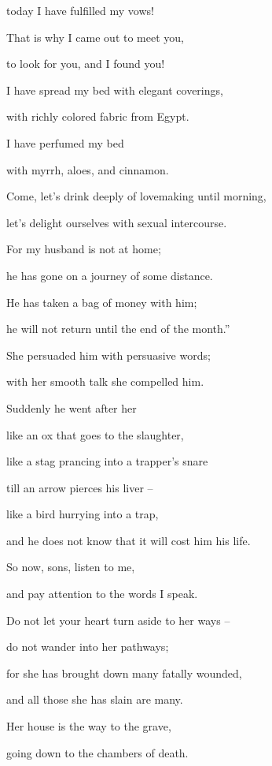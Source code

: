 {\par }{\Q today
I have fulfilled
my vows!
\par }{\Q {}That is why
I came out
to meet
you,
\par }{\Q to look
for you, and I found you!
\par }{\Q {}I have spread
my bed
with elegant coverings,
\par }{\Q with richly
colored
fabric
from Egypt.
\par }{\Q {}I have perfumed
my bed
\par }{\Q with myrrh,
aloes,
and cinnamon.
\par }{\Q {}Come,
let’s drink deeply
of lovemaking
until
morning,
\par }{\Q let’s delight ourselves
with sexual intercourse.
\par }{\Q {}For
my husband
is not
at home;
\par }{\Q he has gone
on a journey
of some distance.
\par }{\Q {}He has taken
a bag
of money
with him;

\par }{\Q he will not return
until the end of the month.”
\par }{\Q {}She persuaded
him with persuasive
words;

\par }{\Q with her smooth
talk
she compelled him.
\par }{\Q {}Suddenly
he went
after
her
\par }{\Q like an ox
that goes
to
the slaughter,
\par }{\Q like a stag prancing
into
a trapper’s snare
\par }{\Q {}till
an arrow
pierces
his liver –
\par }{\Q like a bird
hurrying
into
a trap,
\par }{\Q and he does not
know
that
it will cost him his life.
\par }{\Q {}So now,
sons,
listen
to me,
\par }{\Q and pay attention
to the words
I speak.
\par }{\Q {}Do not
let your heart
turn aside
to her
ways
–
\par }{\Q do not
wander
into her pathways;
\par }{\Q {}for
she has brought
down
many
fatally
wounded,
\par }{\Q and all
those she has slain are many.
\par }{\Q {}Her house
is the way
to the grave,
\par }{\Q going down
to
the chambers
of death.


}
